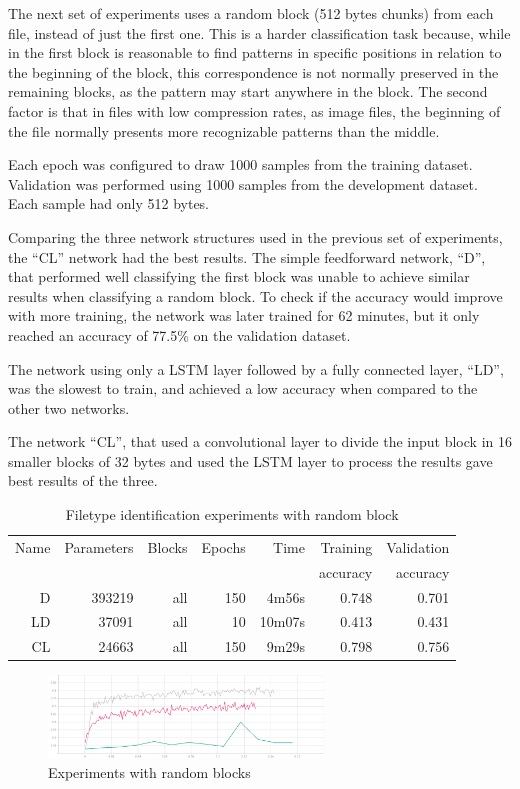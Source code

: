 The next set of experiments uses a random block (512 bytes chunks) from each file, instead of just the first one. This is a harder classification task because, while in the first block is reasonable to find patterns in specific positions in relation to the beginning of the block, this correspondence is not normally preserved in the remaining blocks, as the pattern may start anywhere in the block. The second factor is that in files with low compression rates, as image files, the beginning of the file normally presents more recognizable patterns than the middle.

Each epoch was configured to draw 1000 samples from the training dataset. Validation was performed using 1000 samples from the development dataset. Each sample had only 512 bytes.

Comparing the three network structures used in the previous set of experiments, the ``CL'' network had the best results.
The simple feedforward network, ``D'', that performed well classifying the first block was unable to achieve similar results when classifying a random block.
To check if the accuracy would improve with more training, the network was later trained for 62 minutes, but it only reached an accuracy of 77.5\% on the validation dataset.

The network using only a LSTM layer followed by a fully connected layer, ``LD'', was the slowest to train, and achieved a low accuracy when compared to the other two networks.

The network ``CL'', that used a convolutional layer to divide the input block in 16 smaller blocks of 32 bytes and used the LSTM layer to process the results gave best results of the three.

\begin{table}[!ht]
    \centering
    \caption{Filetype identification experiments with random block}
    \label{tab:carvingrandomblock}
\begin{tabular}{r|r|r|r|r|r|r}
\hline
Name & Parameters & Blocks & Epochs & Time    & Training          & Validation          \\       
     &            &        &        &         &          accuracy &            accuracy \\ \hline\hline

D	    & 393219	& all	& 150	& 4m56s	    & 0.748	& 0.701 \\\hline
LD	    & 37091 	& all	& 10	& 10m07s	& 0.413	& 0.431 \\\hline
CL	    & 24663	    & all	& 150	& 9m29s	    & 0.798	& 0.756 \\\hline
\end{tabular}
\end{table}

\begin{figure}[htb!]
\centering\includegraphics[width=0.65\textwidth]{content/random-block.png}
\caption{\label{fig:randomblock}Experiments with random blocks}%
\end{figure}

